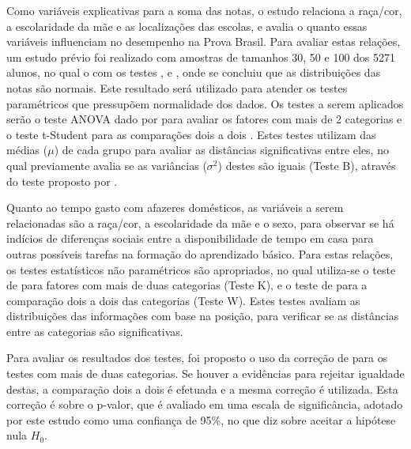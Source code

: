 Como variáveis explicativas para a soma das notas, o estudo relaciona a raça/cor, a escolaridade da mãe e as localizações das escolas,
e avalia o quanto essas variáveis influenciam no desempenho na Prova Brasil. Para avaliar estas relações, um estudo prévio foi realizado
com amostras de tamanhos 30, 50 e 100 dos 5271 alunos, no qual o com os testes , 
e , onde se concluiu que as distribuições das notas são normais. Este resultado será utilizado para atender
os testes paramétricos que pressupõem normalidade dos dados. Os testes a serem aplicados serão o teste ANOVA dado por  para 
avaliar os fatores com mais de 2 categorias e o teste t-Student para as comparações dois a dois \cite{o1908student}.
Estes testes utilizam das médias ($\mu$) de cada grupo para avaliar as distâncias significativas entre eles, no qual previamente avalia se as
variâncias ($\sigma^2$) destes são iguais (Teste B), através do teste proposto por .

Quanto ao tempo gasto com afazeres domésticos, as variáveis a serem relacionadas são a raça/cor, a escolaridade da mãe
e o sexo, para observar se há indícios de diferenças sociais entre a disponibilidade de tempo em casa para outras possíveis 
tarefas na formação do aprendizado básico. Para estas relações, os testes estatísticos não paramétricos são apropriados,
no qual utiliza-se o teste de  para fatores com mais de duas categorias (Teste K), e o
teste de  para a comparação dois a dois das categorias (Teste W). Estes testes avaliam as
distribuições das informações com base na posição, para verificar se as distâncias entre as categorias são significativas.


Para avaliar os resultados dos testes, foi proposto o uso da correção de  para os 
testes com mais de duas categorias. Se houver a evidências para rejeitar igualdade destas, a comparação dois a dois é efetuada e a mesma correção
é utilizada. Esta correção é sobre o p-valor, que é avaliado em uma escala de significância, adotado por este estudo
como uma confiança de 95\%, no que diz sobre aceitar a hipótese nula $H_0$.